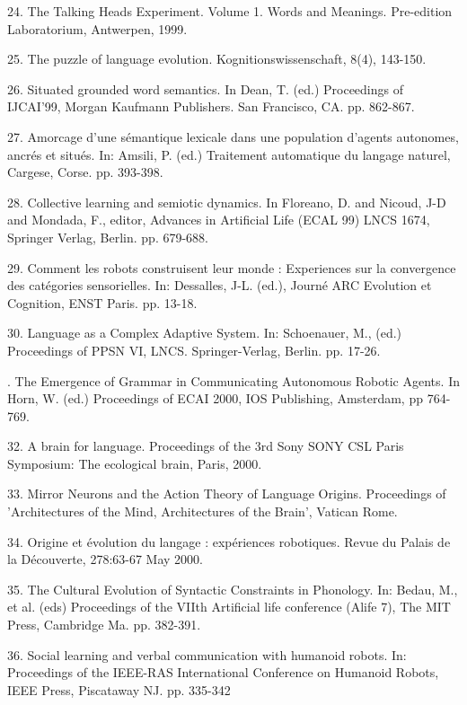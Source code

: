 24. \citet{Steels:99d} The Talking Heads Experiment. Volume 1. Words and Meanings. Pre-edition Laboratorium, Antwerpen, 1999.

25. \citet{Steels:99e} The puzzle of language evolution. Kognitionswissenschaft, 8(4), 143-150. 

26. \citet{Steels:99f} Situated grounded word semantics. In Dean, T. (ed.) Proceedings of IJCAI'99, 
Morgan Kaufmann Publishers. San Francisco, CA. pp. 862-867. 

27. \citet{Steels:99g} Amorcage d'une s\'emantique lexicale dans une population d'agents autonomes, ancr\'es et 
situ\'es. In: Amsili, P. (ed.) Traitement automatique du langage naturel, Cargese, Corse. pp. 393-398. 

28. \citet{Steels:99h} Collective learning and semiotic dynamics. In Floreano, D. and 
Nicoud, J-D and Mondada, F., editor, Advances in Artificial Life (ECAL 99) LNCS 1674, Springer Verlag, Berlin. 
pp. 679-688. 

\enlargethispage{1\baselineskip}
29. \citet{Kaplan:00a} Comment les robots construisent leur monde : Experiences sur la convergence des cat\'egories sensorielles. In: Dessalles, J-L. (ed.), Journ\'e ARC Evolution et Cognition, ENST Paris. pp. 13-18. 

30. \citet{Steels:00b} Language as a Complex Adaptive System. In: Schoenauer, M., (ed.) Proceedings of PPSN VI, LNCS. Springer-Verlag, Berlin. pp. 17-26. 

. \citet{Steels:00c} The Emergence of Grammar in Communicating Autonomous Robotic Agents. In Horn, W. (ed.) Proceedings of ECAI 2000, 
IOS Publishing, Amsterdam, pp 764-769. 

32. \citet{Steels:00d} A brain for language. Proceedings of the 3rd Sony SONY CSL Paris Symposium: The ecological brain, Paris, 2000.

33. \citet{Steels:00e} Mirror Neurons and the Action Theory of Language Origins. Proceedings of 'Architectures of the Mind, Architectures of the Brain', Vatican Rome. 

34.\citet{Steels:00f} Origine et \'evolution du langage : exp\'eriences robotiques. Revue du Palais de la D\'ecouverte, 278:63-67 May 2000.

35. \citet{Steels:00g} The Cultural Evolution of Syntactic Constraints in Phonology. In: Bedau, M., et al.
(eds) Proceedings of the VIIth Artificial life conference (Alife 7), The MIT Press, Cambridge Ma. pp. 382-391. 

36. \citet{Steels:01a} Social learning and verbal communication with humanoid robots. In: Proceedings of the IEEE-RAS International Conference on Humanoid Robots, IEEE Press, Piscataway NJ. pp. 335-342

